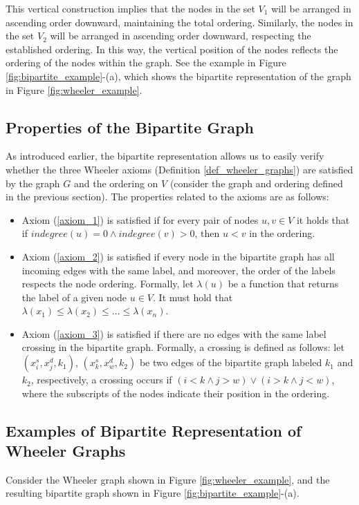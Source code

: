 This vertical construction implies that the nodes in the set $V_1$ will be arranged in ascending order downward, maintaining the total ordering. Similarly, the nodes in the set $V_2$ will be arranged in ascending order downward, respecting the established ordering. In this way, the vertical position of the nodes reflects the ordering of the nodes within the graph. See the example in Figure \ref{fig:bipartite_example}-(a), which shows the bipartite representation of the graph in Figure \ref{fig:wheeler_example}.

\subsection{Properties of the Bipartite Graph}
As introduced earlier, the bipartite representation allows us to easily verify whether the three Wheeler axioms (Definition \ref{def_wheeler_graphs}) are satisfied by the graph $G$ and the ordering on $V$ (consider the graph and ordering defined in the previous section). The properties related to the axioms are as follows:
\begin{itemize}
    \item Axiom (\ref{axiom_1}) is satisfied if for every pair of nodes $u, v \in V$ it holds that if $indegree(u) = 0 \wedge indegree(v) > 0$, then $u < v$ in the ordering.
    \item Axiom (\ref{axiom_2}) is satisfied if every node in the bipartite graph has all incoming edges with the same label, and moreover, the order of the labels respects the node ordering. Formally, let $\lambda(u)$ be a function that returns the label of a given node $u \in V$. It must hold that $\lambda(x_1) \leq \lambda(x_2) \leq \dots \leq \lambda(x_n)$.
    \item Axiom (\ref{axiom_3}) is satisfied if there are no edges with the same label crossing in the bipartite graph. Formally, a crossing is defined as follows: let $(x_i^s,x_j^d,k_1)$, $(x_k^s,x_w^d,k_2)$ be two edges of the bipartite graph labeled $k_1$ and $k_2$, respectively, a crossing occurs if $(i < k \wedge j > w) \lor (i > k \wedge j < w)$, where the subscripts of the nodes indicate their position in the ordering.
\end{itemize}

\begingroup
\sloppy
\raggedright
\subsection{Examples of Bipartite Representation of Wheeler Graphs}
\endgroup
Consider the Wheeler graph shown in Figure \ref{fig:wheeler_example}, and the resulting bipartite graph shown in Figure \ref{fig:bipartite_example}-(a). 

